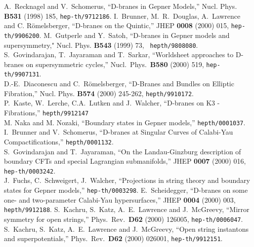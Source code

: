 \documentclass[a4paper,12pt]{article}
\begin{document}
\begin{thebibliography}{99}
A.~Recknagel and V.~Schomerus, ``D-branes in Gepner Models,''
Nucl. Phys. {\bf B531} (1998) 185, {\tt hep-th/9712186}.
 I.~Brunner, M.~R.~Douglas, A.~Lawrence and C.
R\"omelsberger, ``D-branes on the Quintic,'' JHEP {\bf 0008} (2000) 015,
{\tt hep-th/9906200}.
M.~Gutperle and Y.~Satoh, ``D-branes in Gepner models
and supersymmetry," Nucl. Phys. {\bf B543} (1999) 73, {\tt
hepth/9808080}. \\
S.~Govindarajan, T.~Jayaraman and T.~Sarkar,
``Worldsheet approaches to D-branes on supersymmetric cycles,''
Nucl.\ Phys.\ {\bf B580} (2000) 519,
{\tt hep-th/9907131}. \\
D.-E.~Diaconescu and C.~R\"omelsberger,
``D-Branes and Bundles on Elliptic Fibration,'' Nucl. Phys. {\bf B574}
(2000)
245-262, {\tt hepth/9910172}.  \\
P.~Kaste, W.~Lerche, C.A.~Lutken and J.~Walcher, ``D-branes on K3 -
Fibrations,'' {\tt hepth/9912147} \\
M. Naka and M. Nozaki, ``Boundary states in Gep\-ner mod\-els,''
{\tt hepth/0001037}. \\
I.~Brunner and V.~Schomerus, ``D-branes at Singular Curves of
Calabi-Yau Compactifications,'' {\tt hepth/0001132}.\\
S.~Govindarajan and T.~Jayaraman,
``On the Landau-Ginzburg description of boundary CFTs and special
Lagrangian submanifolds,'' JHEP {\bf 0007} (2000) 016,
{\tt hep-th/0003242}. \\
J.~Fuchs, C.~Schweigert, J.~Walcher, ``Projections in string theory
and boundary states for Gepner models,'' {\tt hep-th/0003298}.
 E.~Scheidegger, ``D-branes on some one- and
two-parameter Calabi-Yau hypersurfaces,'' JHEP {\bf 0004} (2000) 003, 
{\tt hepth/9912188}.
S.~Kachru, S.~Katz, A.~E.~Lawrence and J.~McGreevy,
``Mirror symmetry for open strings,''
Phys.\ Rev.\  {\bf D62} (2000) 126005,
{\tt hep-th/0006047}. \\
S.~Kachru, S.~Katz, A.~E.~Lawrence and J.~McGreevy,
``Open string instantons and superpotentials,''
Phys.\ Rev.\ {\bf D62} (2000) 026001,
{\tt hep-th/9912151}. \\

\end{thebibliography}
\end{document}
